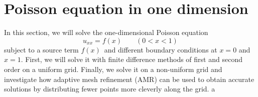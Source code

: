 \section{Poisson equation in one dimension}

In this section, we will solve the one-dimensional Poisson equation
\begin{equation*}
u_{xx} = f(x) \qquad (0 < x < 1)
\end{equation*}
subject to a source term $f(x)$ and different boundary conditions at $x = 0$ and $x = 1$.
First, we will solve it with finite difference methods of first and second order on a uniform grid.
Finally, we solve it on a non-uniform grid and investigate how adaptive mesh refinement (AMR) can be used to obtain accurate solutions by distributing fewer points more cleverly along the grid.
a


